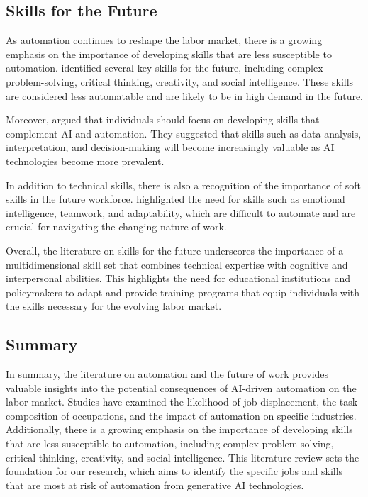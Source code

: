 \documentclass{article}
\begin{document}
\subsection{Skills for the Future}

As automation continues to reshape the labor market, there is a growing emphasis on the importance of developing skills that are less susceptible to automation. \cite{world2018future} identified several key skills for the future, including complex problem-solving, critical thinking, creativity, and social intelligence. These skills are considered less automatable and are likely to be in high demand in the future.

Moreover, \cite{mcafee2017machine} argued that individuals should focus on developing skills that complement AI and automation. They suggested that skills such as data analysis, interpretation, and decision-making will become increasingly valuable as AI technologies become more prevalent.

In addition to technical skills, there is also a recognition of the importance of soft skills in the future workforce. \cite{world2018future} highlighted the need for skills such as emotional intelligence, teamwork, and adaptability, which are difficult to automate and are crucial for navigating the changing nature of work.

Overall, the literature on skills for the future underscores the importance of a multidimensional skill set that combines technical expertise with cognitive and interpersonal abilities. This highlights the need for educational institutions and policymakers to adapt and provide training programs that equip individuals with the skills necessary for the evolving labor market.

\subsection{Summary}

In summary, the literature on automation and the future of work provides valuable insights into the potential consequences of AI-driven automation on the labor market. Studies have examined the likelihood of job displacement, the task composition of occupations, and the impact of automation on specific industries. Additionally, there is a growing emphasis on the importance of developing skills that are less susceptible to automation, including complex problem-solving, critical thinking, creativity, and social intelligence. This literature review sets the foundation for our research, which aims to identify the specific jobs and skills that are most at risk of automation from generative AI technologies.
\end{document}
